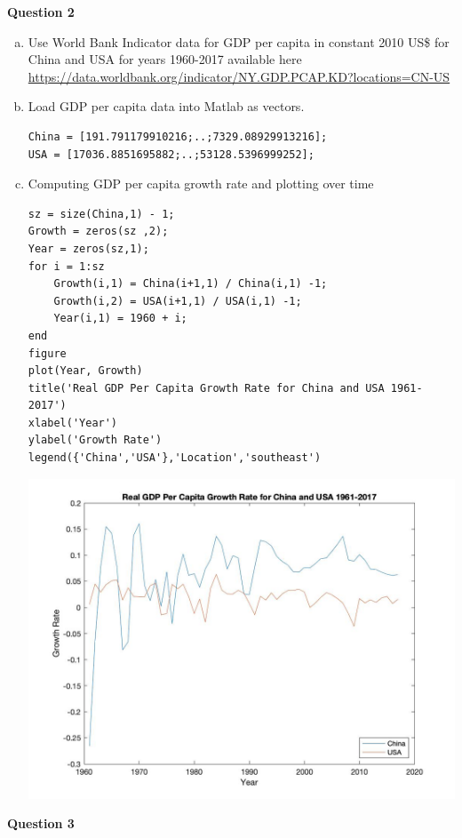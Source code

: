 \documentclass[12pt]{article}
\begin{document}
\begin{onehalfspace}
\begin{enumerate}[(a)]
\begin{enumerate}[1.]
\begin{lstlisting}
\end{lstlisting}
	\end{enumerate}
\end{enumerate}

\textbf{Question 2}\\
\begin{enumerate}[(a)]
	\item
	Use World Bank Indicator data for GDP per capita in constant 2010 US\$ for China and USA for years 1960-2017 available here \url{https://data.worldbank.org/indicator/NY.GDP.PCAP.KD?locations=CN-US}
	\item
	Load GDP per capita data into Matlab as vectors.
	\begin{lstlisting}
China = [191.791179910216;..;7329.08929913216];
USA = [17036.8851695882;..;53128.5396999252];
	\end{lstlisting}
	\item
	Computing GDP per capita growth rate and plotting over time
	\begin{lstlisting}
sz = size(China,1) - 1;
Growth = zeros(sz ,2);
Year = zeros(sz,1);
for i = 1:sz
	Growth(i,1) = China(i+1,1) / China(i,1) -1;
	Growth(i,2) = USA(i+1,1) / USA(i,1) -1;
	Year(i,1) = 1960 + i;
end
figure
plot(Year, Growth)
title('Real GDP Per Capita Growth Rate for China and USA 1961-2017')
xlabel('Year')
ylabel('Growth Rate')
legend({'China','USA'},'Location','southeast')
	\end{lstlisting}
	\includegraphics[width=\textwidth]{Econ_8307_PS1.jpg}
\end{enumerate}

\textbf{Question 3}


\end{onehalfspace}
\end{document}
